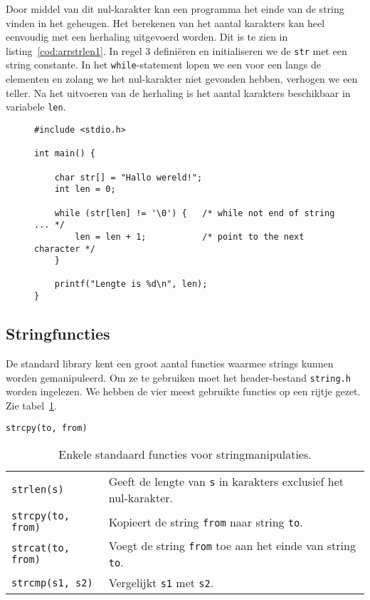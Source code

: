 Door middel van dit nul-karakter kan een programma het einde van de string vinden in het geheugen. Het berekenen van het aantal karakters kan heel eenvoudig met een herhaling uitgevoerd worden. Dit is te zien in listing~\ref{cod:arrstrlen1}. In regel 3 definiëren en initialiseren we de \texttt{str} met een string constante. In het \texttt{while}-statement lopen we een voor een langs de elementen en zolang we het nul-karakter niet gevonden hebben, verhogen we een teller. Na het uitvoeren van de herhaling is het aantal karakters beschikbaar in variabele \texttt{len}.

\begin{figure}[!ht]
\begin{lstlisting}[caption=Berekenen van de lengte van een string.,label=cod:arrstrlen1]
#include <stdio.h>

int main() {

    char str[] = "Hallo wereld!";
    int len = 0;

    while (str[len] != '\0') {   /* while not end of string ... */
        len = len + 1;           /* point to the next character */
    }

    printf("Lengte is %d\n", len);
}
\end{lstlisting}
\end{figure}

\subsection{Stringfuncties}
De standard library kent een groot aantal functies waarmee strings kunnen worden gemanipuleerd. Om ze te gebruiken moet het header-bestand \texttt{string.h} worden ingelezen. We hebben de vier meest gebruikte functies op een rijtje gezet. Zie tabel~\ref{tab:arystringmanip}.

\hbox{\texttt{strcpy(to, from)}}
\begin{table}[!ht]
\centering
\caption{Enkele standaard functies voor stringmanipulaties.}
\label{tab:arystringmanip}
\begin{tabular}{@{}p{4cm}l@{}}
\toprule
\texttt{strlen(s)} &  Geeft de lengte van \texttt{s} in karakters exclusief het nul-karakter.\\
\texttt{strcpy(to, from)} &  Kopieert de string \texttt{from} naar string \texttt{to}.\\
\texttt{strcat(to, from)} &  Voegt de string \texttt{from} toe aan het einde van string \texttt{to}.\\
\texttt{strcmp(s1, s2)} &  Vergelijkt \texttt{s1} met \texttt{s2}.\\
\bottomrule
\end{tabular} 
\end{table}

